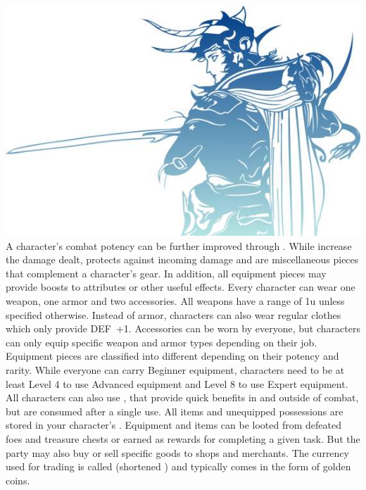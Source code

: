 %
\\
%
\includegraphics[width=\columnwidth]{./art/images/ff1.jpg}
%
\vfill
%
A character's combat potency can be further improved through . 
While  increase the damage dealt,  protects against incoming damage and  are miscellaneous pieces that complement a character's gear.
In addition, all equipment pieces may provide boosts to attributes or other useful effects. 
Every character can wear one weapon, one armor and two accessories. 
All weapons have a range of 1u unless specified otherwise. 
Instead of armor, characters can also wear regular clothes which only provide DEF~+1.
Accessories can be worn by everyone, but characters can only equip specific weapon and armor types depending on their job.
Equipment pieces are classified into different  depending on their potency and rarity.
While everyone can carry Beginner equipment, characters need to be at least Level 4 to use Advanced equipment and Level 8 to use Expert equipment. 
All characters can also use , that provide quick benefits in and outside of combat, but are consumed after a single use.
%
\vfill
%
All items and unequipped possessions are stored in your character's .
Equipment and items can be looted from defeated foes and treasure chests or earned as rewards for completing a given task. 
But the party may also buy or sell specific goods to shops and merchants. 
The currency used for trading is called  (shortened ) and typically comes in the form of golden coins.
